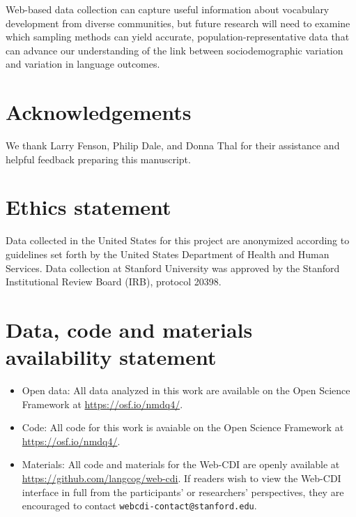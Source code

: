 \documentclass[
  english,
  ,man,floatsintext]{apa6}
\providecommand{\tightlist}{%
  \setlength{\itemsep}{0pt}\setlength{\parskip}{0pt}}
\begin{document}
Web-based data collection can capture useful information about vocabulary development from diverse communities, but future research will need to examine which sampling methods can yield accurate, population-representative data that can advance our understanding of the link between sociodemographic variation and variation in language outcomes.

\hypertarget{acknowledgements}{%
\section{Acknowledgements}\label{acknowledgements}}

We thank Larry Fenson, Philip Dale, and Donna Thal for their assistance and helpful feedback preparing this manuscript.

\hypertarget{ethics-statement}{%
\section{Ethics statement}\label{ethics-statement}}

Data collected in the United States for this project are anonymized according to guidelines set forth by the United States Department of Health and Human Services. Data collection at Stanford University was approved by the Stanford Institutional Review Board (IRB), protocol 20398.

\hypertarget{data-code-and-materials-availability-statement}{%
\section{Data, code and materials availability statement}\label{data-code-and-materials-availability-statement}}

\begin{itemize}
\tightlist
\item
  Open data: All data analyzed in this work are available on the Open Science Framework at \url{https://osf.io/nmdq4/}.
\item
  Code: All code for this work is avaiable on the Open Science Framework at \url{https://osf.io/nmdq4/}.
\item
  Materials: All code and materials for the Web-CDI are openly available at \url{https://github.com/langcog/web-cdi}. If readers wish to view the Web-CDI interface in full from the participants' or researchers' perspectives, they are encouraged to contact \texttt{webcdi-contact@stanford.edu}.
\end{itemize}
\end{document}

